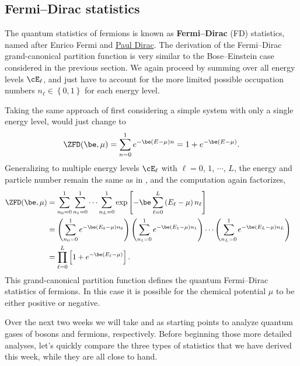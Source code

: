 \subsection{\label{sec:fermi}Fermi--Dirac statistics}
The quantum statistics of fermions is known as \textbf{Fermi--Dirac} (FD) statistics, named after Enrico Fermi and \href{https://en.wikipedia.org/wiki/Paul_Dirac}{Paul Dirac}.
The derivation of the Fermi--Dirac grand-canonical partition function is very similar to the Bose--Einstein case considered in the previous section.
We again proceed by summing over all energy levels $\cE_{\ell}$, and just have to account for the more limited possible occupation numbers $n_{\ell} \in \left\{0, 1\right\}$ for each energy level.

Taking the same approach of first considering a simple system with only a single energy level,  would just change to
\begin{equation*}
  \ZFD(\be, \mu) = \sum_{n = 0}^1 e^{-\be (E - \mu) n} = 1 + e^{-\be (E - \mu)}.
\end{equation*}
Generalizing to multiple energy levels $\cE_{\ell}$ with $\ell = 0$, $1$, $\cdots$, $L$, the energy and particle number remain the same as in , and the computation again factorizes,
\begin{align}
  \ZFD(\be, \mu) & = \sum_{n_0 = 0}^1 \sum_{n_1 = 0}^1 \cdots \sum_{n_L = 0}^1 \exp\left[-\be\sum_{\ell = 0}^L \left(E_{\ell} - \mu\right) n_{\ell}\right] \cr
                 & = \left(\sum_{n_0 = 0}^1 e^{-\be (E_0 - \mu) n_0}\right) \left(\sum_{n_1 = 0}^1 e^{-\be (E_1 - \mu) n_1}\right)\cdots \left(\sum_{n_L = 0}^1 e^{-\be (E_L - \mu) n_L}\right) \cr
                 & = \prod_{\ell = 0}^L \left[1 + e^{-\be (E_{\ell} - \mu)}\right]. \label{eq:partfunc_FD}
\end{align}
This grand-canonical partition function defines the quantum Fermi--Dirac statistics of fermions.
In this case it is possible for the chemical potential $\mu$ to be either positive or negative.

Over the next two weeks we will take \ZBE and \ZFD as starting points to analyze quantum gases of bosons and fermions, respectively.
Before beginning those more detailed analyses, let's quickly compare the three types of statistics that we have derived this week, while they are all close to hand.




